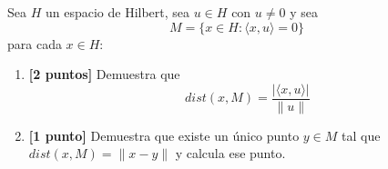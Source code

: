 \documentclass[12pt]{article}
\begin{document}
    \begin{ejercicio}[3 puntos]
        Sea $H$ un espacio de Hilbert, sea $u\in H$ con $u\neq 0$ y sea
        \begin{equation*}
            M = \{x\in H : \langle x,u \rangle =0\}
        \end{equation*}
        para cada $x\in H$:
        \begin{enumerate}[label=\alph*)]
            \item \textbf{[2 puntos]} Demuestra que
                \begin{equation*}
                    dist(x,M) = \frac{|\langle x,u \rangle |}{\|u\|}
                \end{equation*}
            \item \textbf{[1 punto]} Demuestra que existe un único punto $y\in M$ tal que $dist(x,M) = \|x-y\|$ y calcula ese punto.
        \end{enumerate}
    \end{ejercicio}
\end{document}
